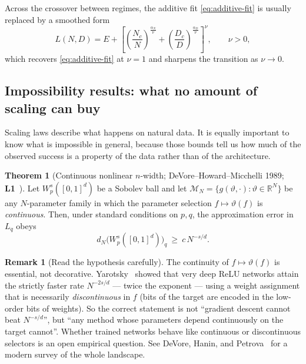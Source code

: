 \documentclass[11pt,a4paper]{article}
\theoremstyle{definition}
\newtheorem{theorem}{Theorem}[section]
\newtheorem{remark}{Remark}[section]
\begin{document}
Across the crossover between regimes, the additive fit \eqref{eq:additive-fit} is usually replaced by a smoothed form
\begin{equation}
  L(N,D) = E + \left[\left(\frac{N_c}{N}\right)^{\frac{\alpha_N}{\nu}} + \left(\frac{D_c}{D}\right)^{\frac{\alpha_D}{\nu}}\right]^{\nu}, \qquad \nu>0,
  \label{eq:crossover}
\end{equation}
which recovers \eqref{eq:additive-fit} at $\nu=1$ and sharpens the transition as $\nu\to 0$.

\subsection{Impossibility results: what no amount of scaling can buy}
\label{subsec:impossibility_bounds}

Scaling laws describe what happens on natural data. It is equally important to know what is impossible in general, because those bounds tell us how much of the observed success is a property of the data rather than of the architecture.

\begin{theorem}[Continuous nonlinear $n$-width; DeVore--Howard--Micchelli 1989; \textbf{L1}~\cite{devore1989optimal}]
Let $W^s_p([0,1]^d)$ be a Sobolev ball and let $\mathcal{M}_N = \{g(\vartheta,\cdot):\vartheta\in\mathbb{R}^N\}$ be any $N$-parameter family in which the parameter selection $f\mapsto \vartheta(f)$ is \emph{continuous}. Then, under standard conditions on $p,q$, the approximation error in $L_q$ obeys
\begin{equation}
  \boxed{d_N\big(W^s_p([0,1]^d)\big)_q \ \ge\ c\,N^{-s/d}} .
\end{equation}
\end{theorem}

\begin{remark}[Read the hypothesis carefully]
The continuity of $f\mapsto\vartheta(f)$ is essential, not decorative. Yarotsky~\cite{yarotsky2018optimal} showed that very deep ReLU networks attain the strictly faster rate $N^{-2s/d}$ --- twice the exponent --- using a weight assignment that is necessarily \emph{discontinuous} in $f$ (bits of the target are encoded in the low-order bits of weights). So the correct statement is not ``gradient descent cannot beat $N^{-s/d}$'', but ``any method whose parameters depend continuously on the target cannot''. Whether trained networks behave like continuous or discontinuous selectors is an open empirical question. See DeVore, Hanin, and Petrova~\cite{devore2021neural} for a modern survey of the whole landscape.
\end{remark}
\end{document}
